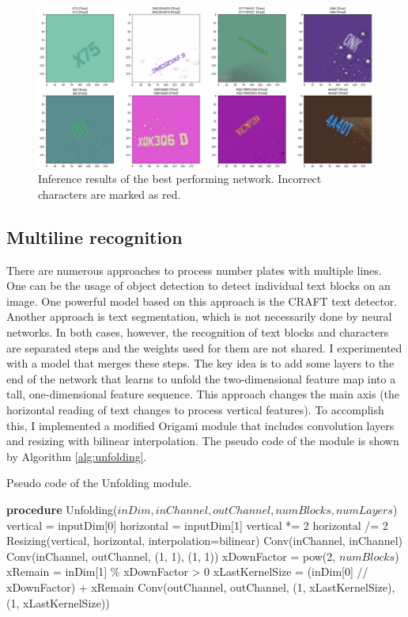\begin{figure}[htb]
 \centerline{\includegraphics[width=1.0\columnwidth]{.//Figure/OCR/inference_sequential.png}}
 \caption{Inference results of the best performing network. Incorrect characters are marked as red.}
 \label{fig:inference_sequential}
\end{figure}

\subsection{Multiline recognition}

There are numerous approaches to process number plates with multiple lines. One can be the usage of object detection to detect individual text blocks on an image. One powerful model based on this approach is the CRAFT\cite{CRAFT} text detector. Another approach is text segmentation, which is not necessarily done by neural networks. In both cases, however, the recognition of text blocks and characters are separated steps and the weights used for them are not shared. I experimented with a model that merges these steps. The key idea is to add some layers to the end of the network that learns to unfold the two-dimensional feature map into a tall, one-dimensional feature sequence. This approach changes the main axis (the horizontal reading of text changes to process vertical features). To accomplish this, I implemented a modified Origami\cite{OrigamiNet} module that includes convolution layers and resizing with bilinear interpolation. The pseudo code of the module is shown by Algorithm \ref{alg:unfolding}.

 \begin{algorithm}
 \caption{Pseudo code of the Unfolding module.}
 \label{alg:unfolding}
 \begin{algorithmic}[1]
    \STATE \textbf{procedure} Unfolding($inDim, inChannel, outChannel, numBlocks, numLayers$)
    \STATE vertical = inputDim[0]
    \STATE horizontal = inputDim[1]
    \STATE vertical *= 2
    \STATE horizontal /= 2
    \STATE Resizing(vertical, horizontal, interpolation=bilinear)
    \STATE Conv(inChannel, inChannel)
    \ENDFOR
    \ENDFOR
    \STATE Conv(inChannel, outChannel, (1, 1), (1, 1))
    \STATE xDownFactor = pow(2, $numBlocks$)
    \STATE xRemain = inDim[1] \% xDownFactor > 0
    \STATE xLastKernelSize = (inDim[0] // xDownFactor) + xRemain
    \STATE Conv(outChannel, outChannel, (1, xLastKernelSize), (1, xLastKernelSize))
\end{algorithmic}
\end{algorithm}

